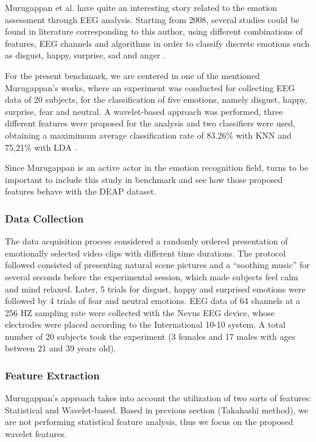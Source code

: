 \documentclass{sig-alternate}
\begin{document}
Murugappan et al. have quite an interesting story related to the emotion assessment through EEG analysis. Starting from 2008, several studies could be found in literature corresponding to this author, using different combinations of features, EEG channels and algorithms in order to classify discrete emotions such as disgust, happy, surprise, sad and anger \cite{murugappan2008time,murugappan2009wavelet}.

For the present benchmark, we are centered in one of the mentioned Murugappan's works, where an experiment was conducted for collecting EEG data of 20 subjects, for the classification of five emotions, namely disgust, happy, surprise, fear and neutral. A wavelet-based approach was performed, three different features were proposed for the analysis and two classifiers were used, obtaining a maximimum average classification rate of 83.26\% with KNN and 75,21\% with LDA \cite{murugappan2010classification}.

Since Murugappan is an active actor in the emotion recognition field, turns to be important to include this study in benchmark and see how those proposed features behave with the DEAP dataset.

\subsubsection{Data Collection}

The data acquisition process considered a randomly ordered presentation of emotionally selected video clips with different time durations. The protocol followed consisted of presenting natural scene pictures and a ``soothing music'' for several seconds before the experimental session, which made subjects feel calm and mind relaxed. Later, 5 trials for disgust, happy and surprised emotions were followed by 4 trials of fear and neutral emotions. EEG data of 64 channels at a 256 HZ sampling rate were collected with the Nevus EEG device, whose electrodes were placed according to the International 10-10 system. A total number of 20 subjects took the experiment (3 females  and 17 males with ages between 21 and 39 years old).

\subsubsection{Feature Extraction}

Murugappan's approach takes into account the utilization of two sorts of features: Statistical and Wavelet-based. Based in previous section (Takahashi method), we are not performing statistical feature analysis, thus we focus on the proposed wavelet features.
\end{document}
